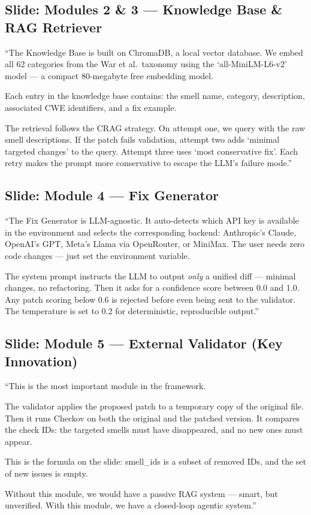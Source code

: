 \documentclass[12pt,a4paper]{article}
\begin{document}
\subsection{Slide: Modules 2 \& 3 --- Knowledge Base \& RAG Retriever}

\begin{saybox}
``The Knowledge Base is built on ChromaDB, a local vector database.
We embed all 62 categories from the War et al.\ taxonomy using
the `all-MiniLM-L6-v2' model --- a compact 80-megabyte free embedding model.

Each entry in the knowledge base contains: the smell name, category, description,
associated CWE identifiers, and a fix example.

The retrieval follows the CRAG strategy. On attempt one, we query with the raw smell descriptions.
If the patch fails validation, attempt two adds `minimal targeted changes' to the query.
Attempt three uses `most conservative fix'. Each retry makes the prompt more conservative
to escape the LLM's failure mode.''
\end{saybox}

\subsection{Slide: Module 4 --- Fix Generator}

\begin{saybox}
``The Fix Generator is LLM-agnostic. It auto-detects which API key is available in the environment
and selects the corresponding backend: Anthropic's Claude, OpenAI's GPT, Meta's Llama via OpenRouter,
or MiniMax. The user needs zero code changes --- just set the environment variable.

The system prompt instructs the LLM to output \textit{only} a unified diff ---
minimal changes, no refactoring. Then it asks for a confidence score between 0.0 and 1.0.
Any patch scoring below 0.6 is rejected before even being sent to the validator.
The temperature is set to 0.2 for deterministic, reproducible output.''
\end{saybox}

\subsection{Slide: Module 5 --- External Validator (Key Innovation)}

\begin{saybox}
``This is the most important module in the framework.

The validator applies the proposed patch to a temporary copy of the original file.
Then it runs Checkov on both the original and the patched version.
It compares the check IDs: the targeted smells must have disappeared, and no new ones must appear.

This is the formula on the slide: smell\_ids is a subset of removed IDs,
and the set of new issues is empty.

Without this module, we would have a passive RAG system ---
smart, but unverified. With this module, we have a closed-loop agentic system.''
\end{saybox}
\end{document}
